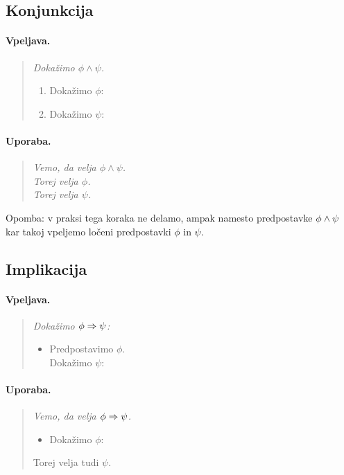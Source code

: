 \subsection{Konjunkcija}

\paragraph{Vpeljava.}
%
\begin{quote}
  \sl
  Dokažimo $\phi \land \psi$.
  \begin{enumerate}
  \item Dokažimo $\phi$: \quad {}
  \item Dokažimo $\psi$: \quad {}
  \end{enumerate}
\end{quote}

\paragraph{Uporaba.}
\begin{quote}
  \sl
  Vemo, da velja $\phi \land \psi$.\\
  Torej velja $\phi$.\\
  Torej velja $\psi$.
\end{quote}
%
Opomba: v praksi tega koraka ne delamo, ampak namesto predpostavke $\phi \land \psi$ kar takoj vpeljemo ločeni
predpostavki $\phi$ in $\psi$.

\subsection{Implikacija}

\paragraph{Vpeljava.}
\begin{quote}
  \sl
  Dokažimo $\phi \Rightarrow \psi$:
  \begin{itemize}
  \item[] Predpostavimo $\phi$. \\
        Dokažimo $\psi$: \quad {}
  \end{itemize}
\end{quote}

\paragraph{Uporaba.}
\begin{quote}
  \sl
  Vemo, da velja $\phi \Rightarrow \psi$.
  \begin{itemize}
  \item[] Dokažimo $\phi$: \quad {}
  \end{itemize}
  Torej velja tudi $\psi$.
\end{quote}

